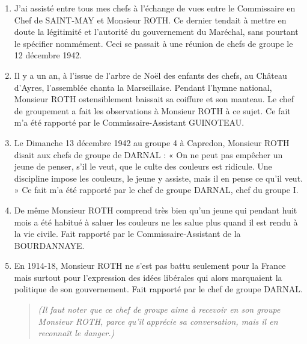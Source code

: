 \begin{enumerate}
\item
J’ai assisté entre tous mes chefs à l’échange de vues
entre le Commissaire en Chef de SAINT-MAY et Monsieur ROTH. Ce dernier
tendait à mettre en doute la légitimité et l’autorité du gouvernement
du Maréchal, sans pourtant le spécifier nommément. Ceci se
passait à une réunion de chefs de groupe le 12 décembre 1942.

\item
Il y a un an, à l’issue de l’arbre de Noël des enfants
des chefs, au Château d’Ayres, l’assemblée chanta la Marseillaise.
Pendant l’hymne national, Monsieur ROTH ostensiblement baissait sa
coiffure et son manteau. Le chef de groupement a fait les observations
à Monsieur ROTH à ce sujet. Ce fait m’a été rapporté par le Commissaire-Assistant GUINOTEAU.

\item
Le Dimanche 13 décembre 1942 au groupe 4 à Capredon,
Monsieur ROTH disait aux chefs de groupe de DARNAL : « On ne
peut pas empêcher un jeune de penser, s’il le veut, que le culte
des couleurs est ridicule. Une discipline impose les couleurs, le
jeune y assiste, mais il en pense ce qu’il veut. » Ce fait m’a été
rapporté par le chef de groupe DARNAL, chef du groupe I.

\item
De même Monsieur ROTH comprend très bien qu’un jeune
qui pendant huit mois a été habitué à saluer les couleurs ne les salue
plus quand il est rendu à la vie civile. Fait rapporté par le Commissaire-Assistant de la BOURDANNAYE.

\item
En 1914-18, Monsieur ROTH ne s’est pas battu seulement
pour la France mais surtout pour l’expression des idées libérales qui
alors marquaient la politique de son gouvernement. Fait rapporté par
le chef de groupe DARNAL.

\begin{quote}
\emph{(Il faut noter que ce chef de groupe aime à recevoir en son
groupe Monsieur ROTH, parce qu’il apprécie sa conversation, mais il
en reconnaît le danger.)
}
\end{quote}
\end{enumerate}

